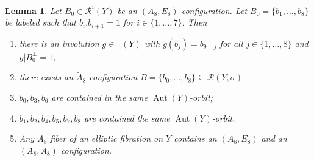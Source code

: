 \documentclass[a4paper]{amsart}
\theoremstyle{definition}
\theoremstyle{plain}
\newtheorem{lemma}[definition]{Lemma}
\DeclareMathOperator{\Aut}{Aut}
\DeclareMathOperator{\aut}{Aut^*}
\newcommand{\R}{\mathcal{R}}
\begin{document}
\begin{lemma}\label{lem:A8E8invol}
Let $B_0 \in \R^i(Y)$ be an $(A_8,E_8)$ configuration. 
Let $B_0= \{b_1,\dots, b_8\}$ be labeled such that $b_i.b_{i+1}=1$ for $i \in \{1,\dots,7\}$. Then
\begin{enumerate}
 \item there is an involution $g \in \aut(Y)$ with $g(b_j)=b_{9-j}$ for all $j \in \{1,\dots,8\}$ and $g|B_0^\perp = 1$;
  \item there exists an $\widetilde{A}_8$ configuration $B=\{b_0,\dots,b_8\} \subseteq \R(Y,\sigma)$
 \item $b_0,b_3,b_6$ are contained in the same $\Aut(Y)$-orbit;
 \item $b_1,b_2,b_4,b_5,b_7,b_8$ are contained the same $\Aut(Y)$-orbit.
 \item Any $\widetilde{A}_8$ fiber of an elliptic fibration on $Y$ contains an $(A_8,E_8)$ and an $(A_8,A_8)$ configuration. 
\end{enumerate}
\end{lemma}
\end{document}
